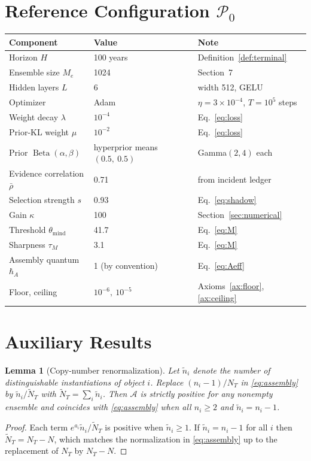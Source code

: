 \documentclass[11pt]{article}
\newtheorem{lemma}{Lemma}[section]
\theoremstyle{remark}
\DeclareMathOperator{\Beta}{Beta}
\newcommand{\rhobar}{\bar{\rho}}
\begin{document}
\section{Reference Configuration $\mathcal{P}_0$}

\begin{center}
\small
\begin{tabular}{@{}lll@{}}
\toprule
Component & Value & Note \\
\midrule
Horizon $H$ & 100 years & Definition~\ref{def:terminal} \\
Ensemble size $M_e$ & 1024 & Section~7 \\
Hidden layers $L$ & 6 & width 512, GELU \\
Optimizer & Adam & $\eta=3\times10^{-4}$, $T=10^{5}$ steps \\
Weight decay $\lambda$ & $10^{-4}$ & Eq.~\eqref{eq:loss} \\
Prior-KL weight $\mu$ & $10^{-2}$ & Eq.~\eqref{eq:loss} \\
Prior $\Beta(\alpha,\beta)$ & hyperprior means $(0.5,\ 0.5)$ & Gamma$(2,4)$ each \\
Evidence correlation $\rhobar$ & 0.71 & from incident ledger \\
Selection strength $s$ & 0.93 & Eq.~\eqref{eq:shadow} \\
Gain $\kappa$ & 100 & Section~\ref{sec:numerical} \\
Threshold $\theta_{\mathrm{mind}}$ & 41.7 & Eq.~\eqref{eq:M} \\
Sharpness $\tau_M$ & 3.1 & Eq.~\eqref{eq:M} \\
Assembly quantum $\hbar_A$ & 1 (by convention) & Eq.~\eqref{eq:Aeff} \\
Floor, ceiling & $10^{-6},\ 10^{-5}$ & Axioms~\ref{ax:floor}, \ref{ax:ceiling} \\
\bottomrule
\end{tabular}
\end{center}

\section{Auxiliary Results}

\begin{lemma}[Copy-number renormalization]\label{lem:copy}
Let $\tilde n_i$ denote the number of distinguishable instantiations of object $i$. Replace $(n_i-1)/N_T$ in \eqref{eq:assembly} by $\tilde n_i/\tilde N_T$ with $\tilde N_T=\sum_i\tilde n_i$. Then $\mathcal{A}$ is strictly positive for any nonempty ensemble and coincides with \eqref{eq:assembly} when all $n_i\ge 2$ and $\tilde n_i=n_i-1$.
\end{lemma}
\begin{proof}
Each term $e^{a_i}\tilde n_i/\tilde N_T$ is positive when $\tilde n_i\ge 1$. If $\tilde n_i=n_i-1$ for all $i$ then $\tilde N_T=N_T-N$, which matches the normalization in \eqref{eq:assembly} up to the replacement of $N_T$ by $N_T-N$. \qedhere
\end{proof}
\end{document}
